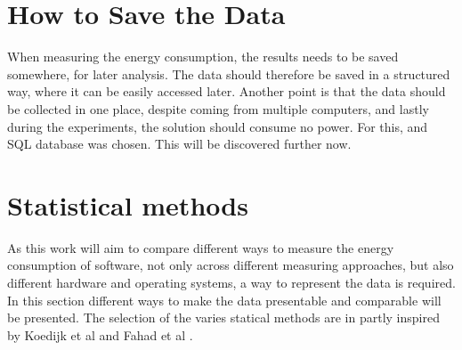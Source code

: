 \section{How to Save the Data}\label{sec:save_data}

When measuring the energy consumption, the results needs to be saved somewhere, for later analysis. The data should therefore be saved in a structured way, where it can be easily accessed later. Another point is that the data should be collected in one place, despite coming from multiple computers, and lastly during the experiments, the solution should consume no power. For this, and SQL database was chosen. This will be discovered further now.



\section{Statistical methods}\label{sec:stat}

As this work will aim to compare different ways to measure the energy consumption of software, not only across different measuring approaches, but also different hardware and operating systems, a way to represent the data is required. In this section different ways to make the data presentable and comparable will be presented. The selection of the varies statical methods are in partly inspired by Koedijk et al\cite{koedijk2022finding} and Fahad et al \cite{fahad2019comparative}.










